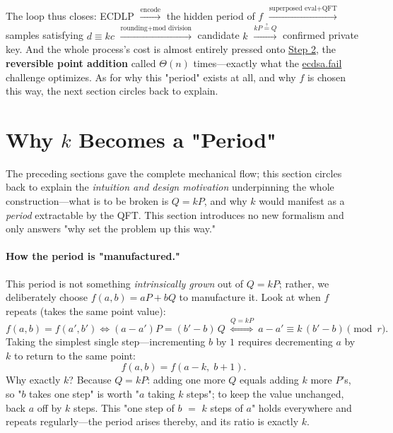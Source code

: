 \documentclass[11pt]{article}
\begin{document}
\medskip
The loop thus closes: ECDLP $\xrightarrow{\text{encode}}$ the hidden period of $f$ $\xrightarrow{\text{superposed eval}+\text{QFT}}$ samples satisfying $d\equiv kc$
$\xrightarrow{\text{rounding}+\text{mod division}}$ candidate $k$ $\xrightarrow{kP\stackrel{?}{=}Q}$ confirmed private key. And the whole process's
cost is almost entirely pressed onto \hyperref[step:eval]{Step 2}, the \textbf{reversible point addition} called $\Theta(n)$ times---exactly what the \href{https://ecdsa.fail}{ecdsa.fail}
challenge optimizes. As for why this "period" exists at all, and why $f$ is chosen this way, the next section circles back to explain.

\section{Why $k$ Becomes a "Period"}

The preceding sections gave the complete mechanical flow; this section circles back to explain the \emph{intuition and design motivation} underpinning the whole construction---what is to be broken is $Q=kP$, and why $k$ would
manifest as a \emph{period} extractable by the QFT. This section introduces no new formalism and only answers "why set the problem up this way."

\paragraph{How the period is "manufactured."}
This period is not something \emph{intrinsically grown} out of $Q=kP$; rather, we deliberately choose $f(a,b)=aP+bQ$ to manufacture it. Look at when $f$ repeats
(takes the same point value):
\[
f(a,b)=f(a',b')\iff (a-a')P=(b'-b)\,Q\ \overset{Q=kP}{\Longleftrightarrow}\ a-a'\equiv k\,(b'-b)\pmod r.
\]
Taking the simplest single step---incrementing $b$ by $1$ requires decrementing $a$ by $k$ to return to the same point:
\[
f(a,b)=f(a-k,\;b+1).
\]
Why exactly $k$? Because $Q=kP$: adding one more $Q$ equals adding $k$ more $P$'s, so "$b$ takes one step" is worth "$a$ taking $k$ steps"; to keep the value unchanged,
back $a$ off by $k$ steps. This "one step of $b$ $=$ $k$ steps of $a$" holds everywhere and repeats regularly---the period arises thereby, and its ratio is exactly $k$.
\end{document}

